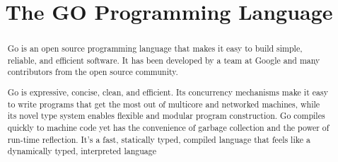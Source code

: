 \documentclass{article}
\begin{document}
\title{The GO Programming Language}
\maketitle
\begin{abstract}

Go is an open source programming language that makes it easy to build simple, reliable, and efficient software. It has been developed by a team at Google and many contributors from the open source community.\hfill\break

Go is expressive, concise, clean, and efficient. Its concurrency mechanisms make it easy to write programs that get the most out of multicore and networked machines, while its novel type system enables flexible and modular program construction. Go compiles quickly to machine code yet has the convenience of garbage collection and the power of run-time reflection. It's a fast, statically typed, compiled language that feels like a dynamically typed, interpreted language\cite{ref:go}




	
	
\end{abstract}	
\end{document}
